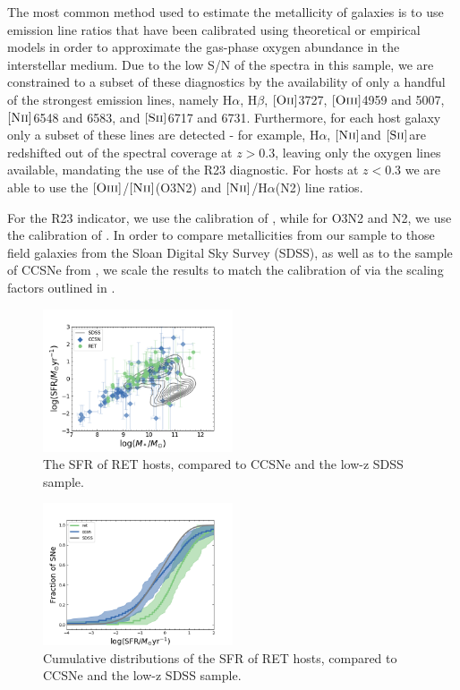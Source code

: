 \documentclass[fleqn,usenatbib,]{mnras}
\newcommand{\halpha}[0]{H$\alpha$}
\newcommand{\hbeta}[0]{H$\beta$}
\newcommand{\OII}[0]{$[\textnormal{\textsc{Oii}}]$}
\newcommand{\OIII}[0]{$[\textnormal{\textsc{Oiii}}]$}
\newcommand{\SII}[0]{$[\textnormal{\textsc{Sii}}]$}
\newcommand{\NII}[0]{$[\textnormal{\textsc{Nii}}]$}
\begin{document}
The most common method used to estimate the metallicity of galaxies is to use emission line ratios that have been calibrated using theoretical or empirical models in order to approximate the gas-phase oxygen abundance in the interstellar medium. Due to the low S/N of the spectra in this sample, we are constrained to a subset of these diagnostics by the availability of only a handful of the strongest emission lines, namely \halpha, \hbeta, \OII 3727, \OIII 4959 and 5007, \NII 6548 and 6583, and \SII 6717 and 6731. Furthermore, for each host galaxy only a subset of these lines are detected - for example, \halpha, \NII and \SII are redshifted out of the spectral coverage at $z>0.3$, leaving only the oxygen lines available, mandating the use of the R23 diagnostic. For hosts at $z<0.3$ we are able to use the \OIII /\NII (O3N2) and \NII /\halpha (N2) line ratios. 

For the R23 indicator, we use the calibration of \citet{Pettini2004}, while for O3N2 and N2, we use the calibration of \citet{Kubulnicky2004}. In order to compare metallicities from our sample to those field galaxies from the Sloan Digital Sky Survey (SDSS), as well as to the sample of CCSNe from \citet{Kelly2012}, we scale the results to match the calibration of \citet{Tremonti2004} via the scaling factors outlined in \citet{Kewley2008}.


\begin{figure}
\includegraphics[width=0.5\textwidth]{figs/SFR_Mike.png}
\caption{The SFR of RET hosts, compared to CCSNe and the low-z SDSS sample.
\label{fig:sfms_sfr}}
\end{figure}

\begin{figure}
\includegraphics[width=0.5\textwidth]{figs/cum_SFR_mike.png}
\caption{Cumulative distributions of the SFR of RET hosts, compared to CCSNe and the low-z SDSS sample.
\label{fig:sfr_cum}}
\end{figure}
\end{document}
